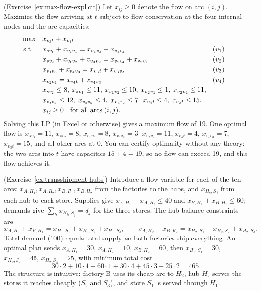 \begin{solution}(Exercise~\ref{ex:max-flow-explicit})
Let $x_{ij} \geq 0$ denote the flow on arc $(i,j)$.  Maximize the flow arriving at $t$ subject to flow conservation at the four internal nodes and the arc capacities:
\begin{align*}
\max \quad & x_{v_3 t} + x_{v_4 t}\\
\text{ s.t. } \quad & x_{s v_1} + x_{v_2 v_1} = x_{v_1 v_3} + x_{v_1 v_2} && (v_1)\\
& x_{s v_2} + x_{v_1 v_2} + x_{v_3 v_2} = x_{v_2 v_4} + x_{v_2 v_1} && (v_2)\\
& x_{v_1 v_3} + x_{v_4 v_3} = x_{v_3 t} + x_{v_3 v_2} && (v_3)\\
& x_{v_2 v_4} = x_{v_4 t} + x_{v_4 v_3} && (v_4)\\
& x_{s v_2} \leq 8, \; x_{s v_1} \leq 11, \; x_{v_1 v_2} \leq 10, \; x_{v_2 v_1} \leq 1, \; x_{v_2 v_4} \leq 11,\\
& x_{v_1 v_3} \leq 12, \; x_{v_3 v_2} \leq 4, \; x_{v_4 v_3} \leq 7, \; x_{v_4 t} \leq 4, \; x_{v_3 t} \leq 15,\\
& x_{ij} \geq 0 \quad \text{for all arcs } (i,j).
\end{align*}
Solving this LP (in Excel or otherwise) gives a maximum flow of 19.  One optimal flow is $x_{s v_1} = 11$, $x_{s v_2} = 8$, $x_{v_1 v_3} = 8$, $x_{v_1 v_2} = 3$, $x_{v_2 v_4} = 11$, $x_{v_4 t} = 4$, $x_{v_4 v_3} = 7$, $x_{v_3 t} = 15$, and all other arcs at 0.  You can certify optimality without any theory: the two arcs into $t$ have capacities $15 + 4 = 19$, so no flow can exceed 19, and this flow achieves it.
\end{solution}

\begin{solution}(Exercise~\ref{ex:transshipment-hubs})
Introduce a flow variable for each of the ten arcs: $x_{A,H_1}, x_{A,H_2}, x_{B,H_1}, x_{B,H_2}$ from the factories to the hubs, and $x_{H_h,S_j}$ from each hub to each store.  Supplies give $x_{A,H_1} + x_{A,H_2} \leq 40$ and $x_{B,H_1} + x_{B,H_2} \leq 60$; demands give $\sum_h x_{H_h,S_j} = d_j$ for the three stores.  The hub balance constraints are
\[
x_{A,H_1} + x_{B,H_1} = x_{H_1,S_1} + x_{H_1,S_2} + x_{H_1,S_3}, \qquad
x_{A,H_2} + x_{B,H_2} = x_{H_2,S_1} + x_{H_2,S_2} + x_{H_2,S_3}.
\]
Total demand ($100$) equals total supply, so both factories ship everything.  An optimal plan sends $x_{A,H_1} = 30$, $x_{A,H_2} = 10$, $x_{B,H_2} = 60$, then $x_{H_1,S_1} = 30$, $x_{H_2,S_2} = 45$, $x_{H_2,S_3} = 25$, with minimum total cost
\[
30 \cdot 2 + 10 \cdot 4 + 60 \cdot 1 + 30 \cdot 4 + 45 \cdot 3 + 25 \cdot 2 = 465.
\]
The structure is intuitive: factory B uses its cheap arc to $H_2$, hub $H_2$ serves the stores it reaches cheaply ($S_2$ and $S_3$), and store $S_1$ is served through $H_1$.
\end{solution}

